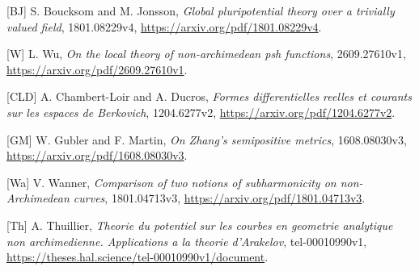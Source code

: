 \documentclass[
  10pt,
]{article}
\begin{document}
{[}BJ{]} S. Boucksom and M. Jonsson, \emph{Global pluripotential theory
over a trivially valued field}, 1801.08229v4,
\url{https://arxiv.org/pdf/1801.08229v4}.

{[}W{]} L. Wu, \emph{On the local theory of non-archimedean psh
functions}, 2609.27610v1, \url{https://arxiv.org/pdf/2609.27610v1}.

{[}CLD{]} A. Chambert-Loir and A. Ducros, \emph{Formes differentielles
reelles et courants sur les espaces de Berkovich}, 1204.6277v2,
\url{https://arxiv.org/pdf/1204.6277v2}.

{[}GM{]} W. Gubler and F. Martin, \emph{On Zhang's semipositive
metrics}, 1608.08030v3, \url{https://arxiv.org/pdf/1608.08030v3}.

{[}Wa{]} V. Wanner, \emph{Comparison of two notions of subharmonicity on
non-Archimedean curves}, 1801.04713v3,
\url{https://arxiv.org/pdf/1801.04713v3}.

{[}Th{]} A. Thuillier, \emph{Theorie du potentiel sur les courbes en
geometrie analytique non archimedienne. Applications a la theorie
d'Arakelov}, tel-00010990v1,
\url{https://theses.hal.science/tel-00010990v1/document}.
\end{document}
